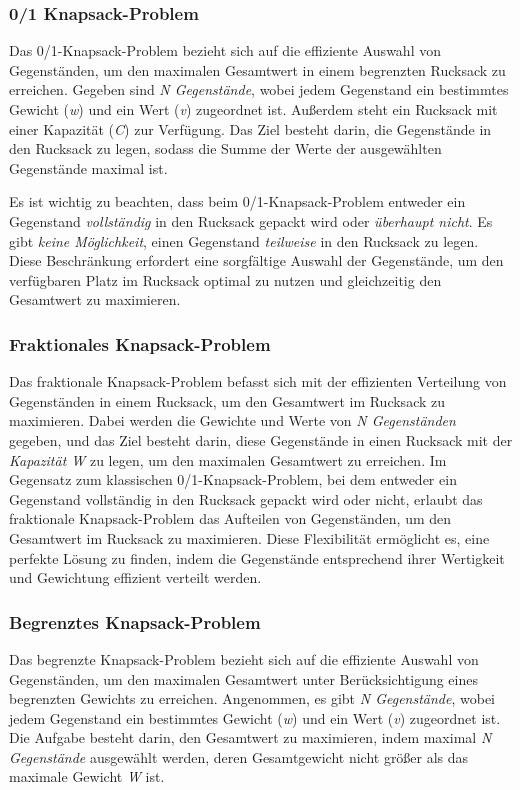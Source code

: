 \subsubsection*{0/1 Knapsack-Problem}
Das 0/1-Knapsack-Problem bezieht sich auf die effiziente Auswahl von Gegenständen, um den maximalen Gesamtwert in einem
begrenzten Rucksack zu erreichen. Gegeben sind \textit{N Gegenstände}, wobei jedem Gegenstand ein bestimmtes Gewicht
(\textit{w}) und ein Wert (\textit{v}) zugeordnet ist. Außerdem steht ein Rucksack mit einer Kapazität (\textit{C}) zur
Verfügung. Das Ziel besteht darin, die Gegenstände in den Rucksack zu legen, sodass die Summe der Werte der ausgewählten
Gegenstände maximal ist.

Es ist wichtig zu beachten, dass beim 0/1-Knapsack-Problem entweder ein Gegenstand \textit{vollständig} in den Rucksack
gepackt wird oder \textit{überhaupt nicht}. Es gibt \textit{keine Möglichkeit}, einen Gegenstand \textit{teilweise} in
den Rucksack zu legen. Diese Beschränkung erfordert eine sorgfältige Auswahl der Gegenstände, um den verfügbaren Platz
im Rucksack optimal zu nutzen und gleichzeitig den Gesamtwert zu maximieren.

\subsubsection*{Fraktionales Knapsack-Problem}
Das fraktionale Knapsack-Problem befasst sich mit der effizienten Verteilung von Gegenständen in einem Rucksack, um den
Gesamtwert im Rucksack zu maximieren. Dabei werden die Gewichte und Werte von \textit{N Gegenständen} gegeben, und das
Ziel besteht darin, diese Gegenstände in einen Rucksack mit der \textit{Kapazität W} zu legen, um den maximalen Gesamtwert
zu erreichen. Im Gegensatz zum klassischen 0/1-Knapsack-Problem, bei dem entweder ein Gegenstand vollständig in den
Rucksack gepackt wird oder nicht, erlaubt das fraktionale Knapsack-Problem das Aufteilen von Gegenständen, um den Gesamtwert
im Rucksack zu maximieren. Diese Flexibilität ermöglicht es, eine perfekte Lösung zu finden, indem die Gegenstände
entsprechend ihrer Wertigkeit und Gewichtung effizient verteilt werden.

\subsubsection*{Begrenztes Knapsack-Problem}
Das begrenzte Knapsack-Problem bezieht sich auf die effiziente Auswahl von Gegenständen, um den maximalen Gesamtwert unter
Berücksichtigung eines begrenzten Gewichts zu erreichen. Angenommen, es gibt \textit{N Gegenstände}, wobei jedem Gegenstand
ein bestimmtes Gewicht (\textit{w}) und ein Wert (\textit{v}) zugeordnet ist. Die Aufgabe besteht darin, den Gesamtwert
zu maximieren, indem maximal \textit{N Gegenstände} ausgewählt werden, deren Gesamtgewicht nicht größer als das maximale
Gewicht \textit{W} ist.

